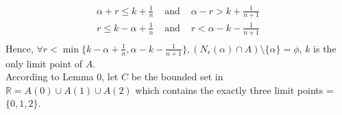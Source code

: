 \begin{eqnarray*}
\alpha + r \le k + \frac{1}{n} &\text{ and }& \alpha - r > k + \frac{1}{n + 1} \\
r \le k - \alpha + \frac{1}{n} &\text{ and }& r < \alpha - k - \frac{1}{n + 1} \\ 
\end{eqnarray*}
Hence, $\forall r < \min\{k - \alpha + \frac{1}{n}, \alpha - k - \frac{1}{n + 1}\}, (N_r(\alpha) \cap A) \setminus \{\alpha\} = \phi$, $k$ is the only limit point of $A$.\\
According to Lemma 0, let $C$ be the bounded set in $\mathbb{R} = A(0) \cup A(1) \cup A(2)$ which contains the exactly three limit points = $\{0, 1, 2\}$.
